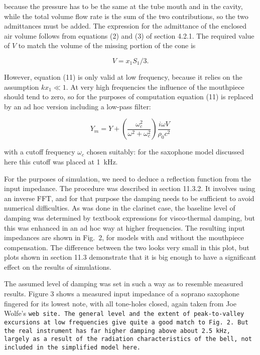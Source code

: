   because the pressure has to be the same at the tube mouth and in the cavity, 
  while the total volume flow rate is the sum of the two contributions, so the 
  two admittances must be added. The expression for the admittance of the 
  enclosed air volume follows from equations (2) and (3) of section 4.2.1. The 
  required value of $V$ to match the volume of the missing portion of the cone 
  is 

  $$V=x_1 S_1/3 . \tag{12}$$ 

  However, equation (11) is only valid at low frequency, because it relies on 
  the assumption $kx_1 \ll 1$. At very high frequencies the influence of the 
  mouthpiece should tend to zero, so for the purposes of computation equation 
  (11) is replaced by an ad hoc version including a low-pass filter: 

  $$Y_m=Y+\left( \dfrac{\omega_c^2}{\omega^2+\omega_c^2} \right) \dfrac{i 
  \omega V}{\rho_0 c^2} \tag{13}$$ 

  with a cutoff frequency $\omega_c$ chosen suitably: for the saxophone model 
  discussed here this cutoff was placed at 1~kHz. 

  For the purposes of simulation, we need to deduce a reflection function from 
  the input impedance. The procedure was described in section 11.3.2. It 
  involves using an inverse FFT, and for that purpose the damping needs to be 
  sufficient to avoid numerical difficulties. As was done in the clarinet case, 
  the baseline level of damping was determined by textbook expressions for 
  visco-thermal damping, but this was enhanced in an ad hoc way at higher 
  frequencies. The resulting input impedances are shown in Fig.\ 2, for models 
  with and without the mouthpiece compensation. The difference between the two 
  looks very small in this plot, but plots shown in section 11.3 demonstrate 
  that it is big enough to have a significant effect on the results of 
  simulations. 

  The assumed level of damping was set in such a way as to resemble measured 
  results. Figure 3 shows a measured input impedance of a soprano saxophone 
  fingered for its lowest note, with all tone-holes closed, again taken from 
  Joe Wolfe’s \tt{}web site\rm{}. The general level and the extent of 
  peak-to-valley excursions at low frequencies give quite a good match to Fig.\ 
  2. But the real instrument has far higher damping above about 2.5~kHz, 
  largely as a result of the radiation characteristics of the bell, not 
  included in the simplified model here. 

